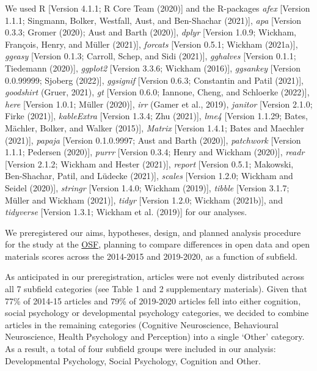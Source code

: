 \documentclass[
  english,
  man,floatsintext]{apa6}
\begin{document}
We used R {[}Version 4.1.1; R Core Team (2020){]} and the R-packages \emph{afex} {[}Version 1.1.1; Singmann, Bolker, Westfall, Aust, and Ben-Shachar (2021){]}, \emph{apa} {[}Version 0.3.3; Gromer (2020); Aust and Barth (2020){]}, \emph{dplyr} {[}Version 1.0.9; Wickham, François, Henry, and Müller (2021){]}, \emph{forcats} {[}Version 0.5.1; Wickham (2021a){]}, \emph{ggeasy} {[}Version 0.1.3; Carroll, Schep, and Sidi (2021){]}, \emph{gghalves} {[}Version 0.1.1; Tiedemann (2020){]}, \emph{ggplot2} {[}Version 3.3.6; Wickham (2016){]}, \emph{ggsankey} {[}Version 0.0.99999; Sjoberg (2022){]}, \emph{ggsignif} {[}Version 0.6.3; Constantin and Patil (2021){]}, \emph{goodshirt} (Gruer, 2021), \emph{gt} {[}Version 0.6.0; Iannone, Cheng, and Schloerke (2022){]}, \emph{here} {[}Version 1.0.1; Müller (2020){]}, \emph{irr} (Gamer et al., 2019), \emph{janitor} {[}Version 2.1.0; Firke (2021){]}, \emph{kableExtra} {[}Version 1.3.4; Zhu (2021){]}, \emph{lme4} {[}Version 1.1.29; Bates, Mächler, Bolker, and Walker (2015){]}, \emph{Matrix} {[}Version 1.4.1; Bates and Maechler (2021){]}, \emph{papaja} {[}Version 0.1.0.9997; Aust and Barth (2020){]}, \emph{patchwork} {[}Version 1.1.1; Pedersen (2020){]}, \emph{purrr} {[}Version 0.3.4; Henry and Wickham (2020){]}, \emph{readr} {[}Version 2.1.2; Wickham and Hester (2021){]}, \emph{report} {[}Version 0.5.1; Makowski, Ben-Shachar, Patil, and Lüdecke (2021){]}, \emph{scales} {[}Version 1.2.0; Wickham and Seidel (2020){]}, \emph{stringr} {[}Version 1.4.0; Wickham (2019){]}, \emph{tibble} {[}Version 3.1.7; Müller and Wickham (2021){]}, \emph{tidyr} {[}Version 1.2.0; Wickham (2021b){]}, and \emph{tidyverse} {[}Version 1.3.1; Wickham et al. (2019){]} for our analyses.

We preregistered our aims, hypotheses, design, and planned analysis procedure for the study at the \href{https://osf.io/gqv9n/?view_only=b97cd4c4f6d645bc9e8870d97b6f3da4}{OSF}, planning to compare differences in open data and open materials scores across the 2014-2015 and 2019-2020, as a function of subfield.

As anticipated in our preregistration, articles were not evenly distributed across all 7 subfield categories (see Table 1 and 2 supplementary materials). Given that 77\% of 2014-15 articles and 79\% of 2019-2020 articles fell into either cognition, social psychology or developmental psychology categories, we decided to combine articles in the remaining categories (Cognitive Neuroscience, Behavioural Neuroscience, Health Psychology and Perception) into a single `Other' category. As a result, a total of four subfield groups were included in our analysis: Developmental Psychology, Social Psychology, Cognition and Other.
\end{document}
